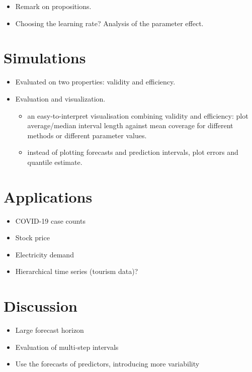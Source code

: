 \documentclass[
  11pt,
  a4paper,
]{article}
\theoremstyle{plain}
\theoremstyle{plain}
\theoremstyle{remark}
\begin{document}
\begin{itemize}
\item
  Remark on propositions.
\item
  Choosing the learning rate? Analysis of the parameter effect.
\end{itemize}

\section{Simulations}\label{simulations}

\begin{itemize}
\item
  Evaluated on two properties: validity and efficiency.
\item
  Evaluation and visualization.

  \begin{itemize}
  \item
    an easy-to-interpret visualisation combining validity and
    efficiency: plot average/median interval length against mean
    coverage for different methods or different parameter values.
  \item
    instead of plotting forecasts and prediction intervals, plot errors
    and quantile estimate.
  \end{itemize}
\end{itemize}

\section{Applications}\label{applications}

\begin{itemize}
\item
  COVID-19 case counts
\item
  Stock price
\item
  Electricity demand
\item
  Hierarchical time series (tourism data)?
\end{itemize}

\section{Discussion}\label{discussion}

\begin{itemize}
\item
  Large forecast horizon
\item
  Evaluation of multi-step intervals
\item
  Use the forecasts of predictors, introducing more variability
\end{itemize}
\end{document}

